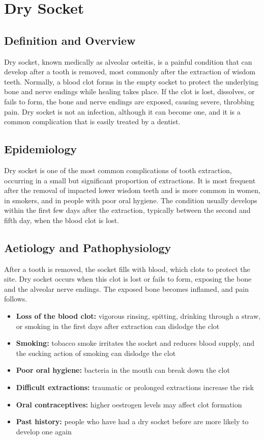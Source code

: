 \chapter{Dry Socket}

\section*{Definition and Overview}
Dry socket, known medically as alveolar osteitis, is a painful condition that can develop after a tooth is removed, most commonly after the extraction of wisdom teeth. Normally, a blood clot forms in the empty socket to protect the underlying bone and nerve endings while healing takes place. If the clot is lost, dissolves, or fails to form, the bone and nerve endings are exposed, causing severe, throbbing pain. Dry socket is not an infection, although it can become one, and it is a common complication that is easily treated by a dentist.

\section*{Epidemiology}
Dry socket is one of the most common complications of tooth extraction, occurring in a small but significant proportion of extractions. It is most frequent after the removal of impacted lower wisdom teeth and is more common in women, in smokers, and in people with poor oral hygiene. The condition usually develops within the first few days after the extraction, typically between the second and fifth day, when the blood clot is lost.

\section*{Aetiology and Pathophysiology}
After a tooth is removed, the socket fills with blood, which clots to protect the site. Dry socket occurs when this clot is lost or fails to form, exposing the bone and the alveolar nerve endings. The exposed bone becomes inflamed, and pain follows.
\begin{itemize}
    \item \textbf{Loss of the blood clot:} vigorous rinsing, spitting, drinking through a straw, or smoking in the first days after extraction can dislodge the clot
    \item \textbf{Smoking:} tobacco smoke irritates the socket and reduces blood supply, and the sucking action of smoking can dislodge the clot
    \item \textbf{Poor oral hygiene:} bacteria in the mouth can break down the clot
    \item \textbf{Difficult extractions:} traumatic or prolonged extractions increase the risk
    \item \textbf{Oral contraceptives:} higher oestrogen levels may affect clot formation
    \item \textbf{Past history:} people who have had a dry socket before are more likely to develop one again
\end{itemize}

